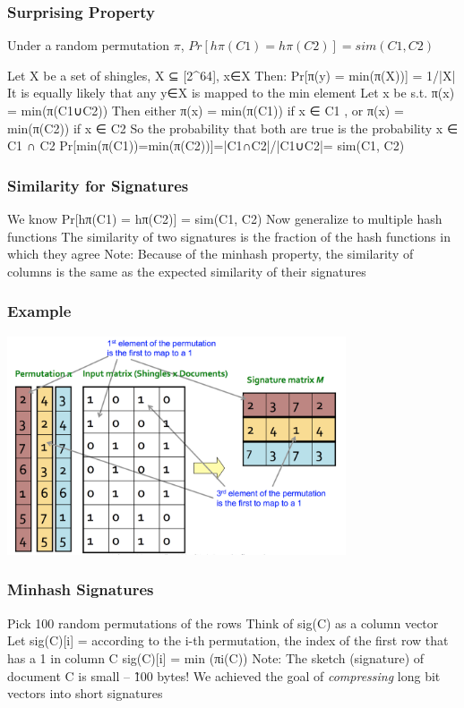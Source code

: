 \documentclass[svgnames]{beamer}
\begin{document}
  
\begin{frame} \frametitle{Surprising Property}

Under a random permutation $\pi$, $Pr[hπ(C1) = hπ(C2)] = sim(C1, C2)$

Let X be a set of shingles, X ⊆ [2^{64}], x∈X
Then: Pr[π(y) = min(π(X))] = 1/|X|
  It is equally likely that any y∈X is mapped to the min element
Let x be s.t. π(x) = min(π(C1∪C2))
Then either π(x) = min(π(C1)) if x ∈ C1 , or π(x) = min(π(C2)) if x ∈ C2
So the probability that both are true is the probability x ∈ C1 ∩ C2
Pr[min(π(C1))=min(π(C2))]=|C1∩C2|/|C1∪C2|= sim(C1, C2)

\end{frame}

  
\begin{frame} \frametitle{Similarity for Signatures}

We know Pr[hπ(C1) = hπ(C2)] = sim(C1, C2)
Now generalize to multiple hash functions
The similarity of two signatures is the fraction of the hash functions in which they agree
Note: Because of the minhash property, the similarity of columns is the same as the expected similarity of their signatures

\end{frame}

  
\begin{frame} \frametitle{Example}

\includegraphics[width=10cm]{minhash}

\end{frame}

  
\begin{frame} \frametitle{Minhash Signatures}

Pick 100 random permutations of the rows
Think of sig(C) as a column vector
Let sig(C)[i] = according to the i-th permutation, the index of the first row that has a 1 in column C
   sig(C)[i] = min (πi(C))
Note: The sketch (signature) of document C is small -- \~100 bytes!
We achieved the goal of \emph{compressing} long bit vectors into short signatures

\end{frame}
\end{document}
